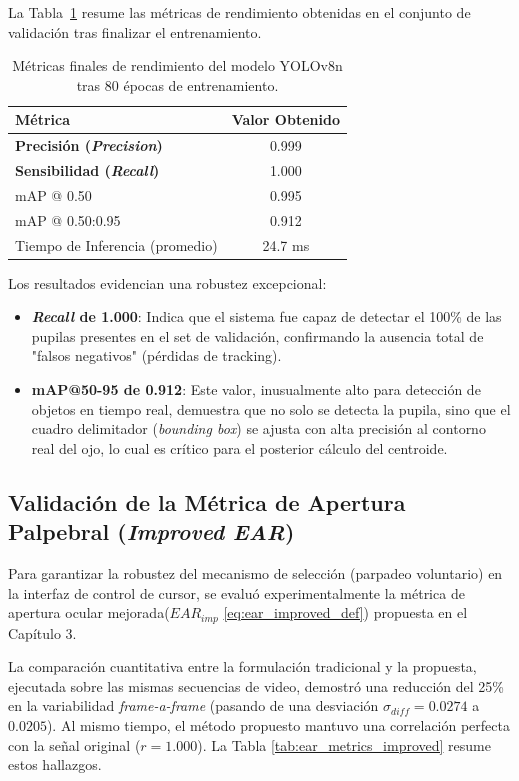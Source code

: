 La Tabla~\ref{tab:yolo_metrics} resume las métricas de rendimiento obtenidas en el conjunto de validación tras finalizar el entrenamiento.
\begin{table}[h!]
	\centering
	\caption{Métricas finales de rendimiento del modelo YOLOv8n tras 80 épocas de entrenamiento.}
	\vspace{0.2cm}
	\begin{tabular}{lc}
		\toprule
		\textbf{Métrica} & \textbf{Valor Obtenido} \\
		\midrule
		\textbf{Precisión (\textit{Precision})} & 0.999 \\
		\textbf{Sensibilidad (\textit{Recall})} & 1.000 \\
		mAP @ 0.50 & 0.995 \\
		mAP @ 0.50:0.95 & 0.912 \\
		Tiempo de Inferencia (promedio) & 24.7 ms \\
		\bottomrule
	\end{tabular}
	\label{tab:yolo_metrics}
\end{table}

Los resultados evidencian una robustez excepcional:
\begin{itemize}
	\item \textbf{\textit{Recall} de 1.000}: Indica que el sistema fue capaz de detectar el 100\% de las pupilas presentes en el set de validación, confirmando la ausencia total de "falsos negativos" (pérdidas de tracking).
	\item \textbf{mAP@50-95 de 0.912}: Este valor, inusualmente alto para detección de objetos en tiempo real, demuestra que no solo se detecta la pupila, sino que el cuadro delimitador (\textit{bounding box}) se ajusta con alta precisión al contorno real del ojo, lo cual es crítico para el posterior cálculo del centroide.
\end{itemize}



\subsection{Validación de la Métrica de Apertura Palpebral (\textit{Improved EAR})}

Para garantizar la robustez del mecanismo de selección (parpadeo voluntario) en la interfaz de control de cursor, se evaluó experimentalmente la métrica de apertura ocular mejorada($EAR_{imp}$ \eqref{eq:ear_improved_def}) propuesta en el Capítulo 3.

La comparación cuantitativa entre la formulación tradicional y la propuesta, ejecutada sobre las mismas secuencias de video, demostró una reducción del 25\% en la variabilidad \textit{frame-a-frame} (pasando de una desviación $\sigma_{diff} = 0.0274$ a $0.0205$). Al mismo tiempo, el método propuesto mantuvo una correlación perfecta con la señal original ($r = 1.000$). La Tabla \ref{tab:ear_metrics_improved} resume estos hallazgos.

